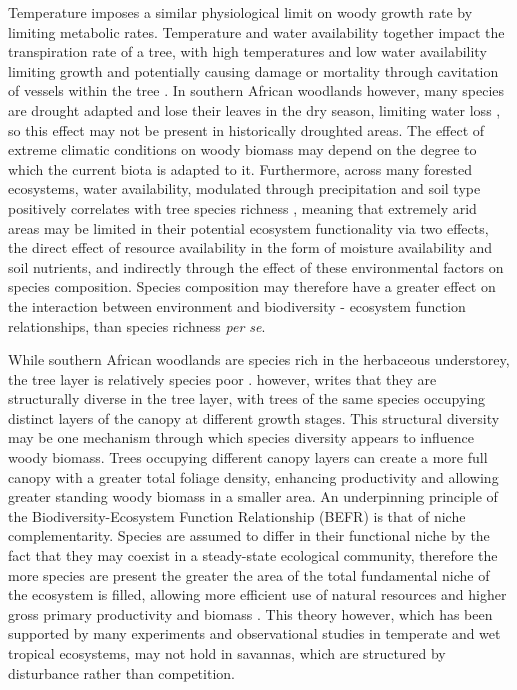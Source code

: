 \documentclass[11pt,a4paper]{article}
\begin{document}
Temperature imposes a similar physiological limit on woody growth rate by limiting metabolic rates. Temperature and water availability together impact the transpiration rate of a tree, with high temperatures and low water availability limiting growth and potentially causing damage or mortality through cavitation of vessels within the tree \citep{Rowland2015a, Fensham2009}. In southern African woodlands however, many species are drought adapted and lose their leaves in the dry season, limiting water loss \citep{Solbrig1996}, so this effect may not be present in historically droughted areas. The effect of extreme climatic conditions on woody biomass may depend on the degree to which the current biota is adapted to it. Furthermore, across many forested ecosystems, water availability, modulated through precipitation and soil type positively correlates with tree species richness \citep{Vila2005}, meaning that extremely arid areas may be limited in their potential ecosystem functionality via two effects, the direct effect of resource availability in the form of moisture availability and soil nutrients, and indirectly through the effect of these environmental factors on species composition. Species composition may therefore have a greater effect on the interaction between environment and biodiversity - ecosystem function relationships, than species richness \textit{per se}.




While southern African woodlands are species rich in the herbaceous understorey, the tree layer is relatively species poor \citep{}. \citet{Solbrig1996} however, writes that they are structurally diverse in the tree layer, with trees of the same species occupying distinct layers of the canopy at different growth stages. This structural diversity may be one mechanism through which species diversity appears to influence woody biomass. Trees occupying different canopy layers can create a more full canopy with a greater total foliage density, enhancing productivity and allowing greater standing woody biomass in a smaller area. An underpinning principle of the Biodiversity-Ecosystem Function Relationship (BEFR) is that of niche complementarity. Species are assumed to differ in their functional niche by the fact that they may coexist in a steady-state ecological community, therefore the more species are present the greater the area of the total fundamental niche of the ecosystem is filled, allowing more efficient use of natural resources and higher gross primary productivity and biomass \citep{}. This theory however, which has been supported by many experiments and observational studies in temperate and wet tropical ecosystems, may not hold in savannas, which are structured by disturbance rather than competition.
\end{document}
